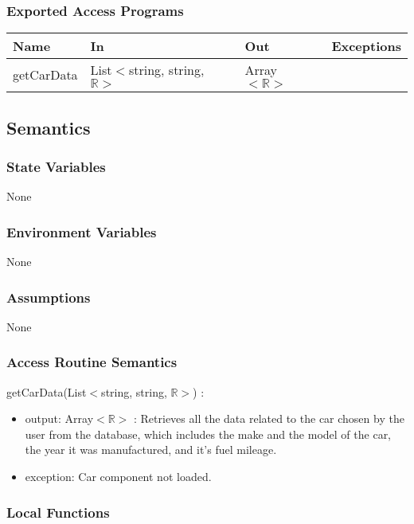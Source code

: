 \documentclass[12pt, titlepage]{article}
\begin{document}
\subsubsection{Exported Access Programs}

\begin{tabular}{| l | l | l | l |}
  \hline
  \textbf{Name} & \textbf{In} & \textbf{Out} & \textbf{Exceptions}\\
  \hline
  getCarData & List$<$string, string, $\mathbb{R}>$ & Array$<\mathbb{R}>$ & ~\\
  \hline
\end{tabular}

\subsection{Semantics}

\subsubsection{State Variables}

None

\subsubsection{Environment Variables}

None

\subsubsection{Assumptions}

None

\subsubsection{Access Routine Semantics}

\noindent getCarData(List$<$string, string, $\mathbb{R}>$) :
\begin{itemize}
\item output: Array$<\mathbb{R}>$ : Retrieves all the data related to the car chosen by the user from the database, which includes the make and the model of the car, the year it was manufactured, and it's fuel mileage.
\item exception: Car component not loaded.
\end{itemize}

\subsubsection{Local Functions}
\end{document}
